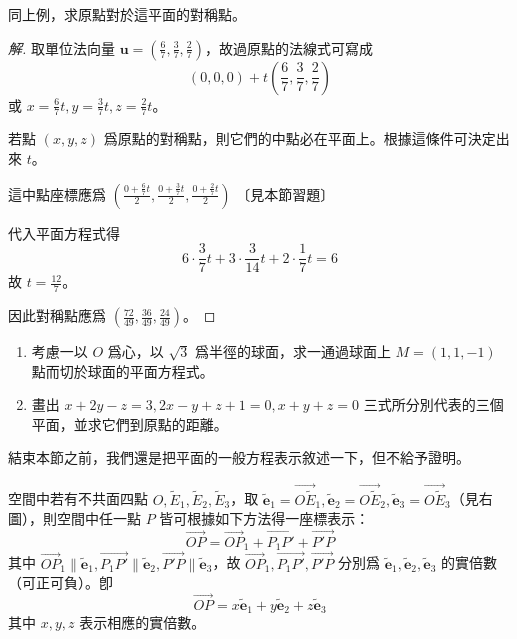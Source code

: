 \begin{example}
同上例，求原點對於這平面的對稱點。
\end{example}

\begin{proof}[解]
取單位法向量 $\mathbf{u} = \left(\frac{6}{7}, \frac{3}{7}, \frac{2}{7}\right)$，故過原點的法線式可寫成
\[
(0, 0, 0) + t\left(\frac{6}{7}, \frac{3}{7}, \frac{2}{7}\right)
\]
或 $x = \frac{6}{7}t, y = \frac{3}{7}t, z = \frac{2}{7}t$。

若點 $(x, y, z)$ 爲原點的對稱點，則它們的中點必在平面上。根據這條件可決定出來 $t$。

這中點座標應爲 $\left(\frac{0 + \frac{6}{7}t}{2}, \frac{0 + \frac{3}{7}t}{2}, \frac{0 + \frac{2}{7}t}{2}\right)$ 〔見本節習題〕

代入平面方程式得
\[
6 \cdot \frac{3}{7}t + 3 \cdot \frac{3}{14}t + 2 \cdot \frac{1}{7}t = 6
\]
故 $t = \frac{12}{7}$。

因此對稱點應爲 $\left(\frac{72}{49}, \frac{36}{49}, \frac{24}{49}\right)$。 \qedhere
\end{proof}

\begin{exercise}[作業 32]
\begin{enumerate}[(1)]
  \item 考慮一以 $O$ 爲心，以 $\sqrt{3}$ 爲半徑的球面，求一通過球面上 $M = (1, 1, -1)$ 點而切於球面的平面方程式。
  \item 畫出 $x + 2y - z = 3, 2x - y + z + 1 = 0, x + y + z = 0$ 三式所分別代表的三個平面，並求它們到原點的距離。
\end{enumerate}
\end{exercise}

結束本節之前，我們還是把平面的一般方程表示敘述一下，但不給予證明。

空間中若有不共面四點 $O, \tilde{E}_1, \tilde{E}_2, \tilde{E}_3$，取 $\tilde{\mathbf{e}}_1 = \vec{O\tilde{E}}_1, \tilde{\mathbf{e}}_2 = \vec{O\tilde{E}}_2, \tilde{\mathbf{e}}_3 = \vec{O\tilde{E}}_3$（見右圖），則空間中任一點 $P$ 皆可根據如下方法得一座標表示：
\[
\vec{OP} = \vec{OP}_1 + \vec{P_1 P'} + \vec{P'P}
\]
其中 $\vec{OP}_1 \parallel \tilde{\mathbf{e}}_1, \vec{P_1 P'} \parallel \tilde{\mathbf{e}}_2, \vec{P'P} \parallel \tilde{\mathbf{e}}_3$，故 $\vec{OP}_1, \vec{P_1 P'}, \vec{P'P}$ 分別爲 $\tilde{\mathbf{e}}_1, \tilde{\mathbf{e}}_2, \tilde{\mathbf{e}}_3$ 的實倍數（可正可負）。卽
\[
\vec{OP} = x\tilde{\mathbf{e}}_1 + y\tilde{\mathbf{e}}_2 + z\tilde{\mathbf{e}}_3
\]
其中 $x, y, z$ 表示相應的實倍數。

